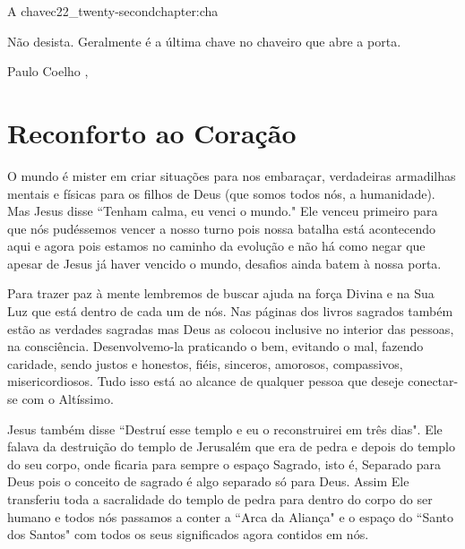 \begin{chapterpage}{A chave}{c22_twenty-secondchapter:cha}

\begin{myquotation}Não desista. Geralmente é a última chave no chaveiro que abre a porta.


 
\par\vspace*{15mm}
\mbox{}\hfill \emdash{}Paulo Coelho 
, %
\par\end{myquotation}

\end{chapterpage}



\section{Reconforto ao Coração}\label{c1_basicformatting:sec}

\emdash{}O mundo é mister em criar situações para nos embaraçar, verdadeiras armadilhas mentais e físicas para os filhos de Deus (que somos todos nós, a humanidade). Mas Jesus disse ``Tenham calma, eu venci o mundo." Ele venceu primeiro para que nós pudéssemos vencer a nosso turno pois nossa batalha está acontecendo aqui e agora pois estamos no caminho da evolução e não há como negar que apesar de Jesus já haver vencido o mundo, desafios ainda batem à nossa porta.

\emdash{}Para trazer paz à mente lembremos de buscar ajuda na força Divina e na Sua Luz que está dentro de cada um de nós. Nas páginas dos livros sagrados também estão as verdades sagradas mas Deus as colocou inclusive no interior das pessoas, na consciência. Desenvolvemo-la praticando o bem, evitando o mal, fazendo caridade, sendo justos e honestos, fiéis, sinceros, amorosos, compassivos, misericordiosos. Tudo isso está ao alcance de qualquer pessoa que deseje conectar-se com o Altíssimo.

\emdash{}Jesus também disse ``Destruí esse templo e eu o reconstruirei em três dias". Ele falava da destruição do templo de Jerusalém que era de pedra e depois do templo do seu corpo, onde ficaria para sempre o espaço Sagrado, isto é, Separado para Deus pois o conceito de sagrado é algo separado só para Deus. Assim Ele transferiu toda a sacralidade do templo de pedra para dentro do corpo do ser humano e todos nós passamos a conter a ``Arca da Aliança" e o espaço do ``Santo dos Santos" com todos os seus significados agora contidos em nós.

